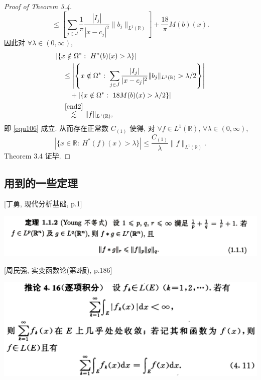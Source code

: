 \documentclass[a4paper,11pt]{article}
\theoremstyle{definition}
\begin{document}
\begin{CJK*}{UTF8}{gbsn}
\begin{proof}[Proof of Theorem 3.4]
$$            \leq \left[ \sum_{j \in J} \frac{1}{\pi} \frac{|I_j|}{|x - c_j|^2} \|b_j\|_{L^1(\mathbb{R})} \right] 
                + \frac{18}{\pi}  M (b)(x).
    $$
    因此对 $ \forall \lambda \in (0, \infty) $,
    \begin{align*}
        &|\{x \notin \Omega^*:\ H^* (b)(x) > \lambda \}| \\
            &\quad\leq \left|\left\{x \notin \Omega^*:\ 
                \sum_{j \in J} \frac{|I_j|}{|x - c_j|^2} \|b_j\|_{L^1(\mathbb{R})} > \lambda / 2 \right\}\right| \\
                &\qquad + |\{x \notin \Omega^*:\ 18 M (b)(x) > \lambda / 2 \}| \\
            &\quad\overset{\eqref{end2}}{\lesssim} \|f\|_{L^1(\mathbb{R})},
    \end{align*}
    即 \eqref{equ106} 成立. 
    从而存在正常数 $ C_{(1)} $ 使得, 对 $ \forall f \in L^1(\mathbb{R})  $, 
    $ \forall \lambda \in (0, \infty) $,
    \begin{equation} \label{equ110}
        |\{x \in \mathbb{R}:\ H^* (f)(x) > \lambda \}|
            \leq \frac{C_{(1)}}{\lambda} \|f\|_{L^1(\mathbb{R})}.
    \end{equation}
    Theorem 3.4 证毕.
\end{proof}

\newpage

\subsection*{用到的一些定理}

\begin{framed}
\setlength{\parindent}{0pt}
[丁勇, 现代分析基础, p.1]
\vspace{0.1cm}

\includegraphics[width=\textwidth]{picture/young.PNG}
\end{framed}

\begin{framed}
\setlength{\parindent}{0pt}
[周民强, 实变函数论(第2版), p.186]
\vspace{0.1cm}
    
\includegraphics[width=\textwidth]{picture/add.PNG}
\end{framed}


\end{CJK*}
\end{document}
